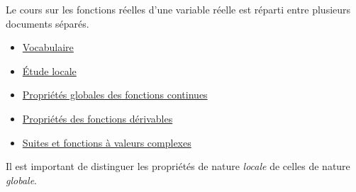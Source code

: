 


Le cours sur les fonctions réelles d'une variable réelle est réparti entre plusieurs documents séparés.
\begin{itemize}
 \item \href{\baseurl C3901.pdf}{Vocabulaire}
 \item \href{\baseurl C2064.pdf}{\'Etude locale}
 \item \href{\baseurl C2072.pdf}{Propriétés globales des fonctions continues}
 \item \href{\baseurl C2070.pdf}{Propriétés des fonctions dérivables}
 \item \href{\baseurl C4791.pdf}{Suites et fonctions à valeurs complexes}
\end{itemize}
Il est important de distinguer les propriétés de nature \emph{locale} de celles de nature \emph{globale}.

